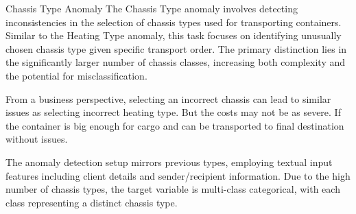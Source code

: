 \sec Chassis Type Anomaly
The Chassis Type anomaly involves detecting inconsistencies in the selection of chassis types used for transporting containers. Similar to the Heating Type anomaly, this task focuses on identifying unusually chosen chassis type given specific transport order. The primary distinction lies in the significantly larger number of chassis classes, increasing both complexity and the potential for misclassification.

From a business perspective, selecting an incorrect chassis can lead to similar issues as selecting incorrect heating type. But the costs may not be as severe. If the container is big enough for cargo and can be transported to final destination without issues.

The anomaly detection setup mirrors previous types, employing textual input features including client details and sender/recipient information. Due to the high number of chassis types, the target variable is multi-class categorical, with each class representing a distinct chassis type.